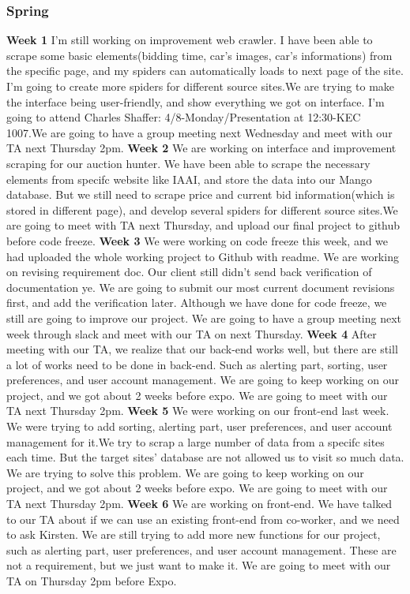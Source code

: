 \documentclass[onecolumn, draftclsnofoot, 10pt, compsoc]{IEEEtran}
\begin{document}
\subsubsection{Spring}
\textbf{Week 1}
I'm still working on improvement web crawler.  I have been able to scrape some basic elements(bidding time, car's images, car's informations) from the specific page, and my spiders can automatically loads to next page of the site.  I'm going to create more spiders for different source sites.We are trying to make the interface being user-friendly, and show everything we got on interface. I'm going to attend Charles Shaffer: 4/8-Monday/Presentation at 12:30-KEC 1007.We are going to have a group meeting next Wednesday and meet with our TA next Thursday 2pm.
\newline
\textbf{Week 2}
We are working on interface and improvement scraping for our auction hunter. We have been able to scrape the necessary elements from specifc website like IAAI, and store the data into our Mango database. But we still need to scrape price and current bid information(which is stored in different page), and develop several spiders for different source sites.We are going to meet with TA next Thursday, and upload our final project to github before code freeze.
\newline
\textbf{Week 3}
We were working on code freeze this week, and we had uploaded the whole working project to Github with readme. We are working on revising requirement doc. Our client still didn't send back verification of documentation ye. We are going to submit our most current document revisions first, and add the verification later. Although we have done for code freeze, we still are going to improve our project. We are going to have a group meeting next week through slack and meet with our TA on next Thursday.
\newline
\textbf{Week 4}
After meeting with our TA, we realize that our back-end works well, but there are still a lot of works need  to be done in back-end. Such as alerting part, sorting, user preferences, and user account management. We are going to keep working on our project, and we got about 2 weeks before expo. We are going to meet with our TA next Thursday 2pm.
\newline
\textbf{Week 5}
We were working on our front-end last week. We were trying to add sorting, alerting part, user preferences, and user account management for it.We try to scrap a large number of data from a specifc sites each time. But the target sites' database are not allowed us to visit so much data. We are trying to solve this problem. We are going to keep working on our project, and we got about 2 weeks before expo. We are going to meet with our TA next Thursday 2pm.
\newline
\textbf{Week 6}
We are working on front-end. We have talked to our TA about if we can use an existing front-end from co-worker, and we need to ask Kirsten. We are still trying to add more new functions for our project, such as alerting part, user preferences, and user account management. These are not a requirement, but we just want to make it. We are going to meet with our TA on Thursday 2pm before Expo.
\end{document}
